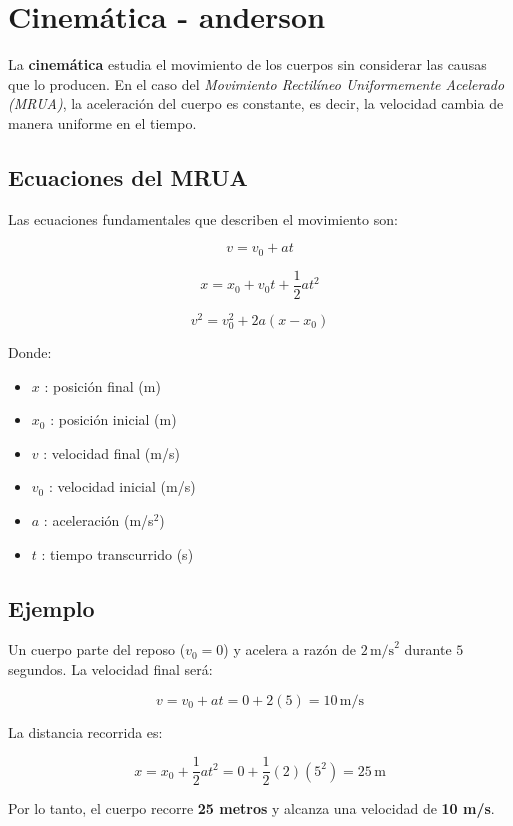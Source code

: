 \section{Cinemática  - anderson}

La \textbf{cinemática} estudia el movimiento de los cuerpos sin considerar las causas que lo producen.  
En el caso del \textit{Movimiento Rectilíneo Uniformemente Acelerado (MRUA)}, la aceleración del cuerpo es constante, es decir, la velocidad cambia de manera uniforme en el tiempo.

\subsection{Ecuaciones del MRUA}

Las ecuaciones fundamentales que describen el movimiento son:

\begin{equation}
v = v_0 + a t
\end{equation}

\begin{equation}
x = x_0 + v_0 t + \frac{1}{2} a t^2
\end{equation}

\begin{equation}
v^2 = v_0^2 + 2a(x - x_0)
\end{equation}

Donde:
\begin{itemize}
    \item $x$ : posición final (m)
    \item $x_0$ : posición inicial (m)
    \item $v$ : velocidad final (m/s)
    \item $v_0$ : velocidad inicial (m/s)
    \item $a$ : aceleración (m/s$^2$)
    \item $t$ : tiempo transcurrido (s)
\end{itemize}

\subsection{Ejemplo}

Un cuerpo parte del reposo ($v_0 = 0$) y acelera a razón de $2 \, \text{m/s}^2$ durante $5$ segundos.  
La velocidad final será:

\begin{equation}
v = v_0 + a t = 0 + 2(5) = 10 \, \text{m/s}
\end{equation}

La distancia recorrida es:

\begin{equation}
x = x_0 + \frac{1}{2} a t^2 = 0 + \frac{1}{2}(2)(5^2) = 25 \, \text{m}
\end{equation}

Por lo tanto, el cuerpo recorre \textbf{25 metros} y alcanza una velocidad de \textbf{10 m/s}.

